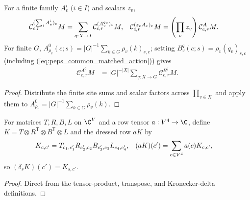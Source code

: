 \begin{lemma}%
    \label{thm:peps_four_cut_common_cut_expansion}
    \leanok
    For a finite family $A^i_v$ ($i\in I$) and scalars $z_v$,
    \begin{align}
        \mathcal C^{(\sum_i A^i_v)_v}_{c,r}M
         & =\sum_{q:X\to I}\mathcal C^{(A^{q_v}_v)_v}_{c,r}M, &
        \mathcal C^{(z_vA_v)_v}_{c,r}M
         & =\left(\prod_vz_v\right)\mathcal C^A_{c,r}M.
        \notag
    \end{align}
    For finite $G$, $A^0_{\rho_v}(c;s)=|G|^{-1}\sum_{k\in G}\rho_v(k)_{s,c}$;
    setting $B^q_v(c;s)=\rho_v(q_v)_{s,c}$ (including (\ref{eq:peps_common_matched_action})) gives
    \begin{align}
        \mathcal C^{A^0}_{c,r}M
         & =|G|^{-|X|}\sum_{q:X\to G}\mathcal C^{B^q}_{c,r}M.
        \label{eq:peps_common_cut_average_expansion}
    \end{align}
\end{lemma}
\begin{proof}\leanok
    Distribute the finite site sums and scalar factors across $\prod_{v\in X}$
    and apply them to $A^0_{\rho_v}=|G|^{-1}\sum_{k\in G}\rho_v(k)$.
\end{proof}

\begin{definition}%
    \label{def:peps_four_cut_common_leg_gauge}
    \leanok
    For matrices $T,R,B,L$ on $\C^V$ and a row tensor $a:V^4\to\C$, define
    $K=T\otimes R^{\mathsf T}\otimes B^{\mathsf T}\otimes L$ and the dressed
    row $aK$ by
    \begin{align}
        K_{c,c'} & =T_{c_1,c'_1}R_{c'_2,c_2}B_{c'_3,c_3}L_{c_4,c'_4}, &
        (aK)(c') & =\sum_{c\in V^4}a(c)K_{c,c'},
        \notag
    \end{align}
    so $(\delta_s K)(c')=K_{s,c'}$.
\end{definition}
\begin{proof}\leanok
    Direct from the tensor-product, transpose, and Kronecker-delta definitions.
\end{proof}

